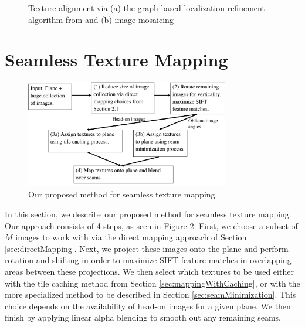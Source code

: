 \documentclass[10pt,twocolumn,letterpaper]{article}
\begin{document}
\begin{figure}
  \centering

  \centering {}
  \caption{Texture alignment via (a) the graph-based localization
    refinement algorithm from \cite{chen2010indoor} and (b) image
    mosaicing}
  \label{fig:mosaic3D}
\end{figure}




\section{Seamless Texture Mapping}
\label{sec:proposedApproach}

\begin{figure}
  \centering
  \includegraphics[width=3.5in]{pipeline.pdf}
  \caption{Our proposed method for seamless texture mapping.}
  \label{fig:pipeline}
\end{figure}


In this section, we describe our proposed method for seamless texture
mapping. Our approach consists of 4 steps, as seen in Figure
\ref{fig:pipeline}.  First, we choose a subset of $M$ images to work
with via the direct mapping approach of Section
\ref{sec:directMapping}. Next, we project these images onto the plane
and perform rotation and shifting in order to maximize SIFT feature
matches in overlapping areas between these projections. We then select
which textures to be used either with the tile caching method from
Section \ref{sec:mappingWithCaching}, or with the more specialized
method to be described in Section \ref{sec:seamMinimization}. This
choice depends on the availability of head-on images for a given
plane. We then finish by applying linear alpha blending to smooth out
any remaining seams.
\end{document}
